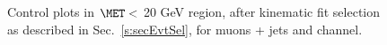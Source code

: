 \begin{figure}
    \caption{Control plots in $\MET <$ 20 GeV region, after kinematic fit selection as described
        in Sec.~\ref{s:secEvtSel}, for muons + jets and \ejets
    channel.}
    \label{fig:LowMET_kfitPlot2}
\end{figure}

